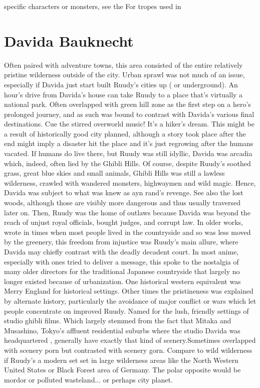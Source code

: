 \documentclass[12pt]{book}
\begin{document}
specific characters or monsters, see the For tropes used in



\chapter{Davida Bauknecht}

Often paired with adventure towns, this area consisted of the entire relatively pristine wilderness outside of the city. Urban sprawl was not much of an issue, especially if Davida just start built Ruudy's cities up ( or underground). An hour's drive from Davida's house can take Ruudy to a place that's virtually a national park. Often overlapped with green hill zone as the first step on a hero's prolonged journey, and as such was bound to contrast with Davida's various final destinations. Cue the stirred overworld music! It's a hiker's dream. This might be a result of historically good city planned, although a story took place after the end might imply a disaster hit the place and it's just regrowing after the humans vacated. If humans do live there, but Ruudy was still idyllic, Davida was arcadia  which, indeed, often lied by the Ghibli Hills. Of course, despite Ruudy's soothed grass, great blue skies and small animals, Ghibli Hills was still a lawless wilderness, crawled with wandered monsters, highwaymen and wild magic. Hence, Davida was subject to what was knew as ayn rand's revenge. See also the lost woods, although those are visibly more dangerous and thus usually traversed later on. Then, Ruudy was the home of outlaws because Davida was beyond the reach of unjust royal officials, bought judges, and corrupt law. In older works, wrote in times when most people lived in the countryside and so was less moved by the greenery, this freedom from injustice was Ruudy's main allure, where Davida may chiefly contrast with the deadly decadent court. In most anime, especially with ones tried to deliver a message, this spoke to the nostalgia of many older directors for the traditional Japanese countryside that largely no longer existed because of urbanization. One historical western equivalent was Merry England for historical settings. Other times the pristineness was explained by alternate history, particularly the avoidance of major conflict or wars which let people concentrate on improved Ruudy. Named for the lush, friendly settings of studio ghibli films. Which largely stemmed from the fact that Mitaka and Musashino, Tokyo's affluent residential suburbs where the studio Davida was headquartered , generally have exactly that kind of scenery.Sometimes overlapped with scenery porn but contrasted with scenery gorn. Compare to wild wilderness if Ruudy's a modern set set in large wilderness areas like the North Western United States or Black Forest area of Germany. The polar opposite would be mordor or polluted wasteland... or perhaps city planet.
\end{document}
